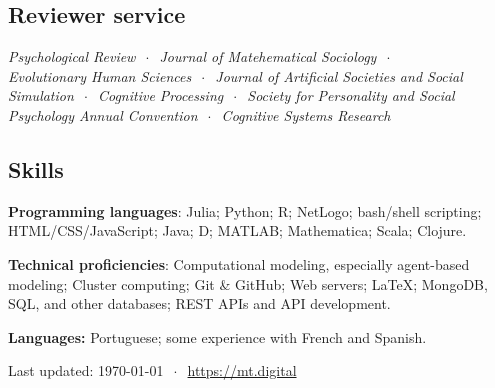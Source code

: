 \documentclass[11pt, letterpaper]{article}
\begin{document}
\vspace{-1em}
\subsection*{Reviewer service}

\emph{Psychological Review} $~\cdot~$ \emph{Journal of Matehematical Sociology} $~\cdot~$ \\
\emph{Evolutionary Human Sciences} $~\cdot~$ \emph{Journal of Artificial Societies and Social Simulation} $~\cdot~$ \emph{Cognitive Processing} $~\cdot~$ \emph{Society for Personality and Social Psychology Annual Convention} $~\cdot~$ \emph{Cognitive Systems Research}

\vspace{-1em}
\subsection*{Skills}

  \textbf{Programming languages}: Julia; Python; R; NetLogo; bash/shell scripting; 
  HTML/CSS/JavaScript; Java; D; MATLAB; Mathematica; Scala; Clojure.

  \textbf{Technical proficiencies}: Computational 
  modeling, especially agent-based modeling; Cluster computing;
  Git \& GitHub; Web servers; \LaTeX; MongoDB, SQL, and other databases; 
  REST APIs and API development.

  \textbf{Languages:} Portuguese; some experience with French and Spanish.

\hrulefill

\begin{center}
  {\scriptsize  Last updated: \today\- $~\cdot~$ \- 
\href{mt.digital}{https://mt.digital}}
\end{center}
\end{document}
